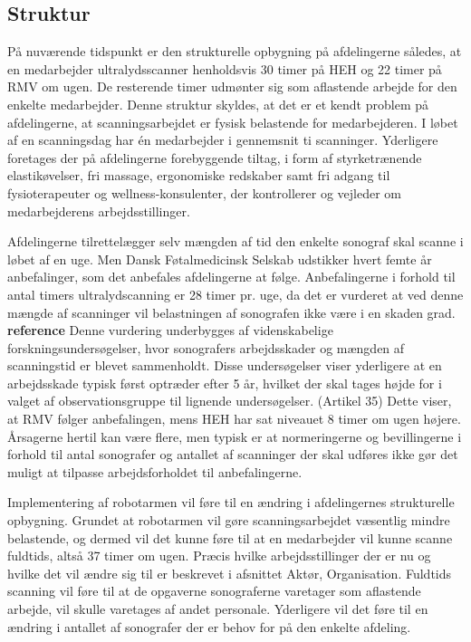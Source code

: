 \subsection{Struktur}
På nuværende tidspunkt er den strukturelle opbygning på afdelingerne således, at en medarbejder ultralydsscanner henholdsvis 30 timer på HEH og 22 timer på RMV om ugen. De resterende timer udmønter sig som aflastende arbejde for den enkelte medarbejder. Denne struktur skyldes, at det er et kendt problem på afdelingerne, at scanningsarbejdet er fysisk belastende for medarbejderen. I løbet af en scanningsdag har én medarbejder i gennemsnit ti scanninger. Yderligere foretages der på afdelingerne forebyggende tiltag, i form af styrketrænende elastikøvelser, fri massage, ergonomiske redskaber samt fri adgang til fysioterapeuter og wellness-konsulenter, der kontrollerer og vejleder om medarbejderens arbejdsstillinger.

Afdelingerne tilrettelægger selv mængden af tid den enkelte sonograf skal scanne i løbet af en uge. Men Dansk Føtalmedicinsk Selskab udstikker hvert femte år anbefalinger, som det anbefales afdelingerne at følge. Anbefalingerne i forhold til antal timers ultralydscanning er 28 timer pr. uge, da det er vurderet at ved denne mængde af scanninger vil belastningen af sonografen ikke være i en skaden grad. \textbf{reference} Denne vurdering underbygges af videnskabelige forskningsundersøgelser, hvor sonografers arbejdsskader og mængden af scanningstid er blevet sammenholdt. Disse undersøgelser viser yderligere at en arbejdsskade typisk først optræder efter 5 år, hvilket der skal tages højde for i valget af observationsgruppe til lignende undersøgelser. (Artikel 35)
Dette viser, at RMV følger anbefalingen, mens HEH har sat niveauet 8 timer om ugen højere. Årsagerne hertil kan være flere, men typisk er at normeringerne og bevillingerne i forhold til antal sonografer og antallet af scanninger der skal udføres ikke gør det muligt at tilpasse arbejdsforholdet til anbefalingerne. 

Implementering af robotarmen vil føre til en ændring i afdelingernes strukturelle opbygning. Grundet at robotarmen vil gøre scanningsarbejdet væsentlig mindre belastende, og dermed vil det kunne føre til at en medarbejder vil kunne scanne fuldtids, altså 37 timer om ugen. Præcis hvilke arbejdsstillinger der er nu og hvilke det vil ændre sig til er beskrevet i afsnittet Aktør, Organisation. Fuldtids scanning vil føre til at de opgaverne sonograferne varetager som aflastende arbejde, vil skulle varetages af andet personale. Yderligere vil det føre til en ændring i antallet af sonografer der er behov for på den enkelte afdeling.

